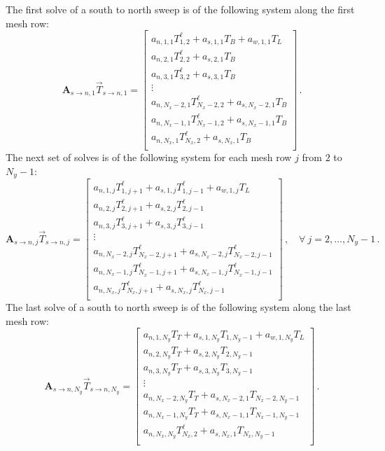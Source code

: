 \documentclass{article}
\begin{document}
The first solve of a south to north sweep is of the following system along the first mesh row:
\begin{equation}
	\label{eq:south_north_1}
	\mathbf{A}_{s\to n, 1} \vec{T}_{s\to n, 1} = 
	\begin{bmatrix}
		a_{n,1,1} T_{1, 2}^\ell + a_{s,1,1} T_B + a_{w,1,1} T_L \\
		a_{n,2,1} T_{2, 2}^\ell + a_{s,2,1} T_B \\
		a_{n,3,1} T_{3, 2}^\ell + a_{s,3,1} T_B \\
		\vdots \\
		a_{n,N_x - 2,1} T_{N_x - 2, 2}^\ell + a_{s,N_x - 2,1} T_B \\
		a_{n,N_x - 1,1} T_{N_x - 1, 2}^\ell + a_{s,N_x - 1,1} T_B \\
		a_{n,N_x,1} T_{N_x, 2}^\ell + a_{s,N_x,1} T_B \\
	\end{bmatrix}\,.
\end{equation}
The next set of solves is of the following system for each mesh row $j$ from $2$ to $N_y - 1$:
\begin{equation}
	\label{eq:south_north_2}
	\mathbf{A}_{s\to n, j} \vec{T}_{s\to n, j} = 
	\begin{bmatrix}
		a_{n,1,j} T_{1, j + 1}^\ell + a_{s,1,j} T_{1, j - 1}^\ell + a_{w,1,j} T_L \\
		a_{n,2,j} T_{2, j + 1}^\ell + a_{s,2,j} T_{2, j - 1}^\ell \\
		a_{n,3,j} T_{3, j + 1}^\ell + a_{s,3,j} T_{3, j - 1}^\ell \\
		\vdots \\
		a_{n,N_x - 2,j} T_{N_x - 2, j+1}^\ell + a_{s,N_x - 2,j} T_{N_x - 2, j - 1}^\ell \\
		a_{n,N_x - 1,j} T_{N_x - 1, j+1}^\ell + a_{s,N_x - 1,j} T_{N_x - 1, j - 1}^\ell \\
		a_{n,N_x,j} T_{N_x, j+1}^\ell + a_{s,N_x,j} T_{N_x, j - 1}^\ell \\
	\end{bmatrix}\,, \quad \forall ~ j = 2, \ldots, N_y - 1\,.
\end{equation}
The last solve of a south to north sweep is of the following system along the last mesh row:
\begin{equation}
	\label{eq:south_north_3}
	\mathbf{A}_{s\to n, N_y} \vec{T}_{s\to n, N_y} = 
	\begin{bmatrix}
		a_{n,1,N_y} T_T + a_{s,1,N_y} T_{1, N_y - 1} + a_{w,1,N_y} T_L \\
		a_{n,2,N_y} T_T + a_{s,2,N_y} T_{2, N_y - 1} \\
		a_{n,3,N_y} T_T + a_{s,3,N_y} T_{3, N_y - 1} \\
		\vdots \\
		a_{n,N_x - 2,N_y} T_T + a_{s,N_x - 2,1} T_{N_x - 2, N_y - 1} \\
		a_{n,N_x - 1,N_y} T_T + a_{s,N_x - 1,1} T_{N_x - 1, N_y - 1} \\
		a_{n,N_x,N_y} T_{N_x, 2}^\ell + a_{s,N_x,1} T_{N_x, N_y - 1} \\
	\end{bmatrix}\,.
\end{equation}
\end{document}
